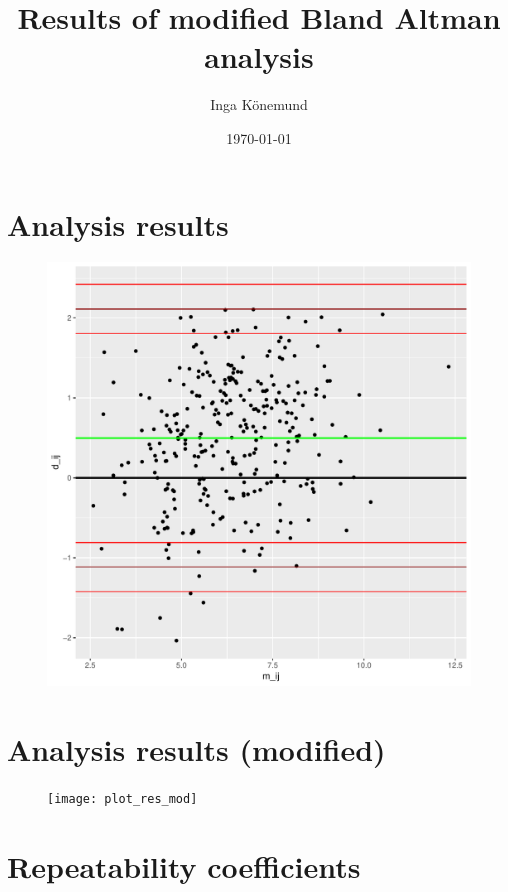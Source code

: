 \documentclass{article}\usepackage[]{graphicx}\usepackage[]{color}
\title{Results of modified Bland Altman analysis}
\author{Inga Könemund}
\date{\today}
\begin{document}
\maketitle

\newpage
\section{Analysis results}



\begin{figure}
\centering
\includegraphics[width=1\textwidth]{plot_res}
\end{figure}

\section{Analysis results (modified)}



\begin{figure}
\centering
\texttt{[image: plot\_res\_mod]}
\end{figure}

\section {Repeatability coefficients}

\end{document}
